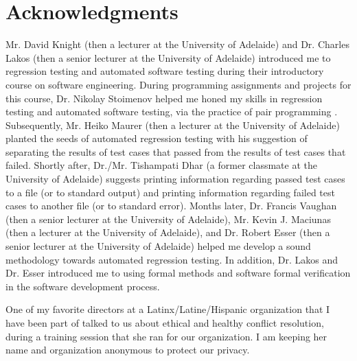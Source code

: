 \documentclass[letter,12pt]{article}
\begin{document}
\section*{Acknowledgments}
\label{sec:Acknowledgments}


Mr. David Knight (then a lecturer at the University of Adelaide) and Dr. Charles Lakos (then a senior lecturer at the University of Adelaide) introduced me to regression testing and automated software testing during their introductory course on software engineering. During programming assignments and projects for this course, Dr. Nikolay Stoimenov helped me honed my skills in regression testing and automated software testing, via the practice of pair programming \cite{DeOrio2016,Fox2013,Oram2011,Jalote2008,Shore2008,Wiegers2002}. Subsequently, Mr. Heiko Maurer (then a lecturer at the University of Adelaide) planted the seeds of automated regression testing with his suggestion of separating the results of test cases that passed from the results of test cases that failed. Shortly after, Dr./Mr. Tishampati Dhar (a former classmate at the University of Adelaide) suggests printing information regarding passed test cases to a file (or to standard output) and printing information regarding failed test cases to another file (or to standard error). Months later, Dr. Francis Vaughan (then a senior lecturer at the University of Adelaide), Mr. Kevin J. Maciunas (then a lecturer at the University of Adelaide), and Dr. Robert Esser (then a senior lecturer at the University of Adelaide) helped me develop a sound methodology towards automated regression testing. In addition, Dr. Lakos and Dr. Esser introduced me to using formal methods and software formal verification in the software development process.

One of my favorite directors at a Latinx/Latine/Hispanic organization that I have been part of talked to us about ethical and healthy conflict resolution, during a training session that she ran for our organization. I am keeping her name and organization anonymous to protect our privacy.
\end{document}

